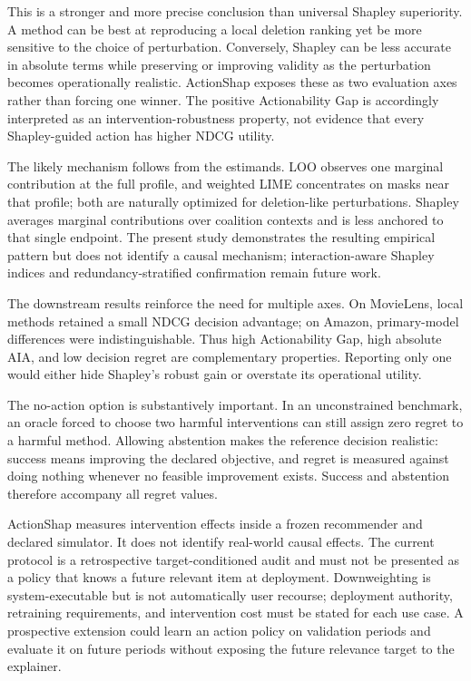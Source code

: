 \documentclass[11pt]{article}
\begin{document}
This is a stronger and more precise conclusion than universal Shapley superiority. A method can be best at reproducing a local deletion ranking yet be more sensitive to the choice of perturbation. Conversely, Shapley can be less accurate in absolute terms while preserving or improving validity as the perturbation becomes operationally realistic. ActionShap exposes these as two evaluation axes rather than forcing one winner. The positive Actionability Gap is accordingly interpreted as an intervention-robustness property, not evidence that every Shapley-guided action has higher NDCG utility.

The likely mechanism follows from the estimands. LOO observes one marginal contribution at the full profile, and weighted LIME concentrates on masks near that profile; both are naturally optimized for deletion-like perturbations. Shapley averages marginal contributions over coalition contexts and is less anchored to that single endpoint. The present study demonstrates the resulting empirical pattern but does not identify a causal mechanism; interaction-aware Shapley indices and redundancy-stratified confirmation remain future work.

The downstream results reinforce the need for multiple axes. On MovieLens, local methods retained a small NDCG decision advantage; on Amazon, primary-model differences were indistinguishable. Thus high Actionability Gap, high absolute AIA, and low decision regret are complementary properties. Reporting only one would either hide Shapley's robust gain or overstate its operational utility.

The no-action option is substantively important. In an unconstrained benchmark, an oracle forced to choose two harmful interventions can still assign zero regret to a harmful method. Allowing abstention makes the reference decision realistic: success means improving the declared objective, and regret is measured against doing nothing whenever no feasible improvement exists. Success and abstention therefore accompany all regret values.

ActionShap measures intervention effects inside a frozen recommender and declared simulator. It does not identify real-world causal effects. The current protocol is a retrospective target-conditioned audit and must not be presented as a policy that knows a future relevant item at deployment. Downweighting is system-executable but is not automatically user recourse; deployment authority, retraining requirements, and intervention cost must be stated for each use case. A prospective extension could learn an action policy on validation periods and evaluate it on future periods without exposing the future relevance target to the explainer.
\end{document}
